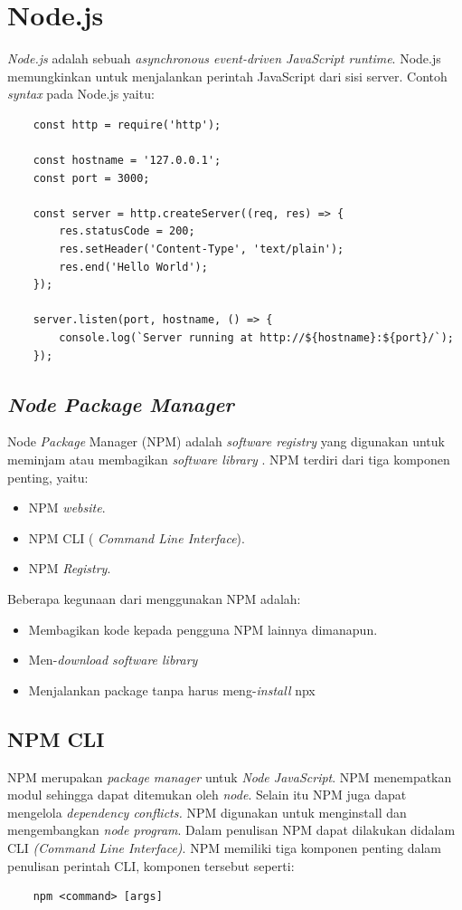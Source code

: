 \section{Node.js}
\label{sec:nodejs}
\textit{Node.js} adalah sebuah \textit{asynchronous event-driven JavaScript runtime}. Node.js memungkinkan untuk menjalankan perintah JavaScript dari sisi server\cite{Nodejs:01:about}. Contoh \textit{syntax} pada Node.js yaitu:
\begin{lstlisting}
	const http = require('http');
	
	const hostname = '127.0.0.1';
	const port = 3000;
	
	const server = http.createServer((req, res) => {
		res.statusCode = 200;
		res.setHeader('Content-Type', 'text/plain');
		res.end('Hello World');
	});
	
	server.listen(port, hostname, () => {
		console.log(`Server running at http://${hostname}:${port}/`);
	});
\end{lstlisting}

\subsection{\textit{Node Package Manager}}
Node \textit{Package} Manager (NPM) adalah \textit{software registry} yang digunakan untuk meminjam atau membagikan \textit{software library} \cite{npmAbout}. NPM terdiri dari tiga komponen penting, yaitu:
\begin{itemize}
	\item NPM \textit{website}.
	\item NPM CLI ( \textit{Command Line Interface}). 
	\item NPM \textit{Registry}.
\end{itemize}

Beberapa kegunaan dari menggunakan NPM adalah:
\begin{itemize}
	\item Membagikan kode kepada pengguna NPM lainnya dimanapun.
	\item Men-\textit{download software library}
	\item Menjalankan pack\textit{}age tanpa harus meng-\textit{install} npx
\end{itemize}

\subsection{NPM CLI}
NPM merupakan \textit{package manager} untuk \textit{Node JavaScript}. NPM menempatkan modul sehingga dapat ditemukan oleh \textit{node}. Selain itu NPM juga dapat mengelola \textit{dependency conflicts.} NPM digunakan untuk menginstall dan mengembangkan \textit{node program}. Dalam penulisan NPM dapat dilakukan didalam CLI \textit{(Command Line Interface)}. NPM memiliki tiga komponen penting dalam penulisan perintah CLI, komponen tersebut seperti:
\begin{verbatim}
	npm <command> [args]
\end{verbatim}

